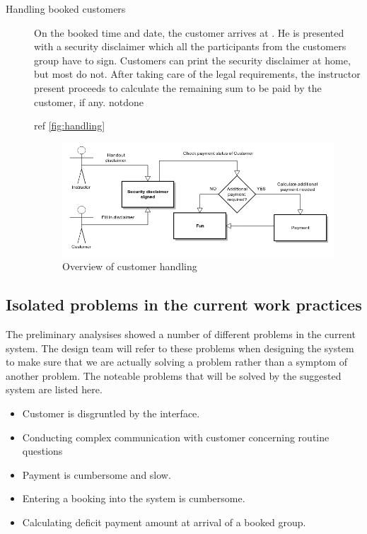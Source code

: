 \begin{description}
\item[Handling booked customers]
On the booked time and date, the customer arrives at \gomonkey{}. He is presented with a security disclaimer
which all the participants from the customers group have to sign. Customers can print the security disclaimer 
at home, but most do not. After taking care of the legal requirements, the instructor present proceeds to
calculate the remaining sum to be paid by the customer, if any. notdone

ref \autoref{fig:handling}

\begin{figure}[htbp]
    \centering
        \includegraphics[width=\textwidth]{figures/handling.png}
            \caption{Overview of customer handling}
        \label{fig:handling}
\end{figure}
\end{description}


\subsection{Isolated problems in the current work practices}
The preliminary analysises showed a number of different problems in the current system. 
The design team will refer to these problems when designing the system
to make sure that we are actually solving a problem rather than a symptom
of another problem. The noteable problems that will be solved by the suggested system are listed here.

\begin{itemize}
	\item Customer is disgruntled by the interface.
	\item Conducting complex communication with customer concerning routine questions
	\item Payment is cumbersome and slow.
	\item Entering a booking into the system is cumbersome.
	\item Calculating deficit payment amount at arrival of a booked group.
\end{itemize}

